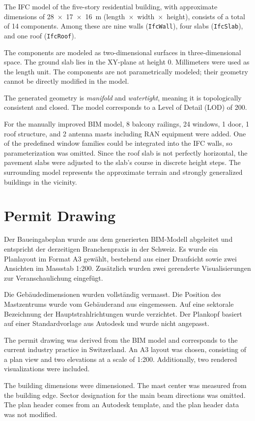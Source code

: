 \begin{English}
    The IFC model of the five-story residential building, with approximate dimensions of 28~$\times$~17~$\times$~16~m (length~$\times$~width~$\times$~height), consists of a total of 14 components. Among these are nine walls (\texttt{IfcWall}), four slabs (\texttt{IfcSlab}), and one roof (\texttt{IfcRoof}).

    The components are modeled as two-dimensional surfaces in three-dimensional space. The ground slab lies in the XY-plane at height 0. Millimeters were used as the length unit. The components are not parametrically modeled; their geometry cannot be directly modified in the model.

    The generated geometry is \emph{manifold} and \emph{watertight}, meaning it is topologically consistent and closed. The model corresponds to a Level of Detail (LOD) of 200.

    For the manually improved BIM model, 8 balcony railings, 24 windows, 1 door, 1 roof structure, and 2 antenna masts including RAN equipment were added. One of the predefined window families could be integrated into the IFC walls, so parameterization was omitted. Since the roof slab is not perfectly horizontal, the pavement slabs were adjusted to the slab's course in discrete height steps. The surrounding model represents the approximate terrain and strongly generalized buildings in the vicinity.
\end{English}

\section{Permit Drawing}
\begin{German}
    Der Baueingabeplan wurde aus dem generierten BIM-Modell abgeleitet und entspricht der derzeitigen Branchenpraxis in der Schweiz. Es wurde ein Planlayout im Format A3 gewählt, bestehend aus einer Draufsicht sowie zwei Ansichten im Massstab 1:200. Zusätzlich wurden zwei gerenderte Visualisierungen zur Veranschaulichung eingefügt.

    Die Gebäudedimensionen wurden vollständig vermasst. Die Position des Mastzentrums wurde vom Gebäuderand aus eingemessen. Auf eine sektorale Bezeichnung der Hauptstrahlrichtungen wurde verzichtet. Der Plankopf basiert auf einer Standardvorlage aus Autodesk und wurde nicht angepasst.
\end{German}

\begin{English}
    The permit drawing was derived from the BIM model and corresponds to the current industry practice in Switzerland. An A3 layout was chosen, consisting of a plan view and two elevations at a scale of 1:200. Additionally, two rendered visualizations were included.

    The building dimensions were dimensioned. The mast center was measured from the building edge. Sector designation for the main beam directions was omitted. The plan header comes from an Autodesk template, and the plan header data was not modified.
\end{English}
